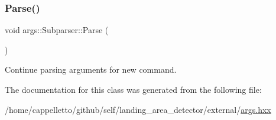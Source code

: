 \subsubsection{\texorpdfstring{Parse()}{Parse()}}
{\footnotesize\ttfamily void args\+::\+Subparser\+::\+Parse (\begin{DoxyParamCaption}{ }\end{DoxyParamCaption})}

Continue parsing arguments for new command. 

The documentation for this class was generated from the following file\+:\begin{DoxyCompactItemize}
\item 
/home/cappelletto/github/self/landing\+\_\+area\+\_\+detector/external/\hyperlink{args_8hxx}{args.\+hxx}\end{DoxyCompactItemize}

